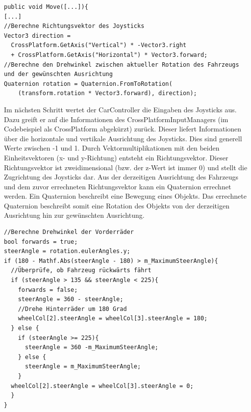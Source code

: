 	\begin{lstlisting}
public void Move([...]){
[...]
//Berechne Richtungsvektor des Joysticks
Vector3 direction =
  CrossPlatform.GetAxis("Vertical") * -Vector3.right
  + CrossPlatform.GetAxis("Horizontal") * Vector3.forward;
//Berechne den Drehwinkel zwischen aktueller Rotation des Fahrzeugs und der gewünschten Ausrichtung
Quaternion rotation = Quaternion.FromToRotation(
	(transform.rotation * Vector3.forward), direction);
	\end{lstlisting}

	Im nächsten Schritt wertet der CarController die Eingaben des Joysticks aus. Dazu greift er auf die Informationen des CrossPlatformInputManagers (im Codebeispiel als CrossPlatform abgekürzt) zurück. Dieser liefert Informationen über die horizontale und vertikale Ausrichtung des Joysticks. Dies sind generell Werte zwischen -1 und 1. Durch Vektormultiplikationen mit den beiden Einheitsvektoren (x- und y-Richtung) entsteht ein Richtungsvektor. Dieser Richtungsvektor ist zweidimensional (bzw. der z-Wert ist immer 0) und stellt die Zugrichtung des Joysticks dar.
	Aus der derzeitigen Ausrichtung des Fahrzeugs und dem zuvor errechneten Richtungsvektor kann ein Quaternion errechnet werden. Ein Quaternion beschreibt eine Bewegung eines Objekts. Das errechnete Quaternion beschreibt somit eine Rotation des Objekts von der derzeitigen Ausrichtung hin zur gewünschten Ausrichtung.

	\begin{lstlisting}
//Berechne Drehwinkel der Vorderräder
bool forwards = true;
steerAngle = rotation.eulerAngles.y;
if (180 - Mathf.Abs(steerAngle - 180) > m_MaximumSteerAngle){
  //Überprüfe, ob Fahrzeug rückwärts fährt
  if (steerAngle > 135 && steerAngle < 225){
	forwards = false;
	steerAngle = 360 - steerAngle;
	//Drehe Hinterräder um 180 Grad
	wheelCol[2].steerAngle = wheelCol[3].steerAngle = 180;
  } else {
    if (steerAngle >= 225){
	  steerAngle = 360 -m_MaximumSteerAngle;
    } else {
  	  steerAngle = m_MaximumSteerAngle;
    }
  wheelCol[2].steerAngle = wheelCol[3].steerAngle = 0;
  }
}
	\end{lstlisting}


